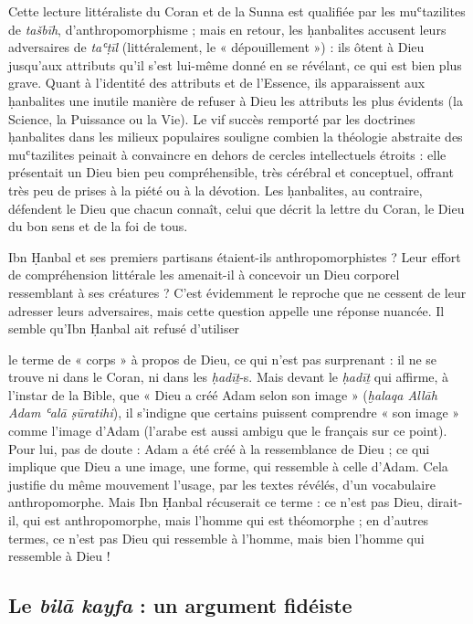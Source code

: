 Cette lecture littéraliste du Coran et de la Sunna est qualifiée par les
muʿtazilites de \emph{tašbīh}, d'anthropomorphisme ; mais en retour, les
ḥanbalites accusent leurs adversaires de \emph{taʿṭīl} (littéralement,
le « dépouillement ») : ils ôtent à Dieu jusqu'aux attributs qu'il s'est
lui-même donné en se révélant, ce qui est bien plus grave. Quant à
l'identité des attributs et de l'Essence, ils apparaissent aux
ḥanbalites une inutile manière de refuser à Dieu les attributs les plus
évidents (la Science, la Puissance ou la Vie). Le vif succès remporté
par les doctrines ḥanbalites dans les milieux populaires souligne
combien la théologie abstraite des muʿtazilites peinait à convaincre en
dehors de cercles intellectuels étroits : elle présentait un Dieu bien
peu compréhensible, très cérébral et conceptuel, offrant très peu de
prises à la piété ou à la dévotion. Les ḥanbalites, au contraire,
défendent le Dieu que chacun connaît, celui que décrit la lettre du
Coran, le Dieu du bon sens et de la foi de tous.

Ibn Ḥanbal et ses premiers partisans étaient-ils anthropomorphistes ?
Leur effort de
compréhension littérale les amenait-il à concevoir un Dieu corporel
ressemblant à ses créatures ? C'est évidemment le reproche que ne
cessent de leur adresser leurs adversaires, mais cette question appelle
une réponse nuancée. Il semble qu'Ibn Ḥanbal ait refusé d'utiliser

le terme de « corps » à propos de Dieu, ce qui n'est pas surprenant : il
ne se trouve ni dans le Coran, ni dans les \emph{ḥadīṯ}-s. Mais devant
le \emph{ḥadīṯ} qui affirme, à l'instar de la Bible, que « Dieu a créé
Adam selon son image » (\emph{ḫalaqa Allāh Adam ʿalā ṣūratihi}), il
s'indigne que certains puissent comprendre « son image » comme l'image
d'Adam (l'arabe est aussi ambigu que le français sur ce point). Pour
lui, pas de doute : Adam a été créé à la ressemblance de Dieu ; ce qui
implique que Dieu a une image, une forme, qui ressemble à celle d'Adam.
Cela justifie du même mouvement l'usage, par les textes révélés, d'un
vocabulaire anthropomorphe. Mais Ibn Ḥanbal récuserait ce terme : ce
n'est pas Dieu, dirait-il, qui est anthropomorphe, mais l'homme qui est
théomorphe ; en d'autres termes, ce n'est pas Dieu qui ressemble à
l'homme, mais bien l'homme qui ressemble à Dieu !



  
  \subsection{Le \emph{bilā kayfa} : un argument fidéiste}
  



